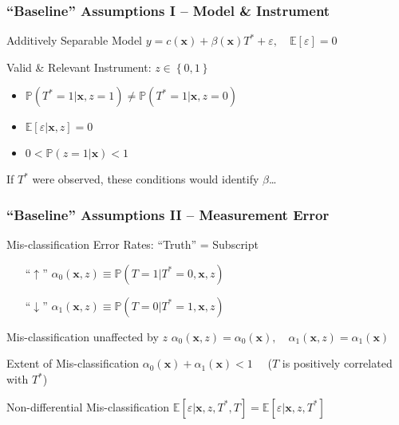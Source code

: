\documentclass{beamer}
\begin{document}
\begin{frame}
  \frametitle{``Baseline'' Assumptions I -- Model \& Instrument}

  \begin{block}{Additively Separable Model}
    $y = c(\mathbf{x}) + \beta(\mathbf{x}) T^* + \varepsilon, \quad \mathbb{E}[ \varepsilon] = 0$ 
  \end{block}

  \begin{block}{Valid \& Relevant Instrument: $z \in \left\{ 0,1 \right\}$}
    \begin{itemize}
      \item $\mathbb{P}(T^*=1|\mathbf{x},z=1) \neq \mathbb{P}(T^*=1|\mathbf{x},z=0)$
      \item $\mathbb{E}[\varepsilon|\mathbf{x},z] = 0$
      \item $0 < \mathbb{P}(z=1|\mathbf{x}) < 1$
    \end{itemize}
  \end{block}

  \begin{alertblock}{If $T^*$ were observed, these conditions would identify $\beta$\dots}
  \end{alertblock}
\end{frame}
\begin{frame}
  \frametitle{``Baseline'' Assumptions II -- Measurement Error}


  \begin{alertblock}{Mis-classification Error Rates: ``Truth'' = Subscript}
    \begin{itemize}
      \item[``$\boldsymbol{\uparrow}$''] 
    $\alpha_0(\mathbf{x},z) \equiv \mathbb{P}\left(T=1|T^*=0,\mathbf{x},z  \right)$
  \item[``$\boldsymbol{\downarrow}$''] 
  $\alpha_1(\mathbf{x},z) \equiv \mathbb{P}\left(T=0|T^*=1,\mathbf{x},z  \right)$
    \end{itemize}
  \end{alertblock}

  \begin{block}{Mis-classification unaffected by $z$}
    $\alpha_0(\mathbf{x},z) = \alpha_0(\mathbf{x}), \quad   \alpha_1(\mathbf{x},z) = \alpha_1(\mathbf{x})$
  \end{block}

  \begin{block}{Extent of Mis-classification}
      $\alpha_0(\mathbf{x}) + \alpha_1(\mathbf{x}) < 1 \quad$ ($T$ is positively correlated with $T^*$)
  \end{block}

  \begin{block}{Non-differential Mis-classification}
     $\mathbb{E}[\varepsilon|\mathbf{x},z,T^*,T] = \mathbb{E}[\varepsilon|\mathbf{x},z, T^*]$
  \end{block}



\end{frame}
\end{document}

